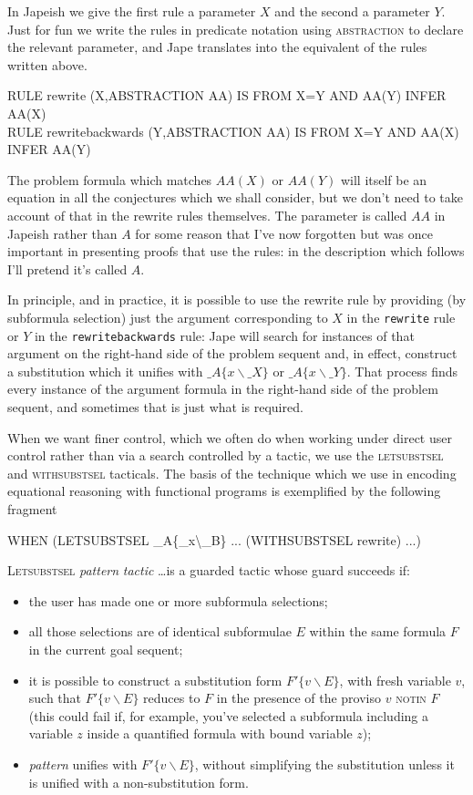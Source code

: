 In Japeish we give the first rule a parameter $X$ and the second a parameter $Y$. Just for fun we write the rules in predicate notation using \textsc{abstraction} to declare the relevant parameter, and Jape translates into the equivalent of the rules written above.
\begin{japeish}
RULE   rewrite (X,ABSTRACTION AA)           IS FROM X=Y AND AA(Y) INFER AA(X)\\
RULE   rewritebackwards (Y,ABSTRACTION AA)  IS FROM X=Y AND AA(X) INFER AA(Y)
\end{japeish}
The problem formula which matches $AA(X)$ or $AA(Y)$ will itself be an equation in all the conjectures which we shall consider, but we don't need to take account of that in the rewrite rules themselves. The parameter is called $AA$ in Japeish rather than $A$ for some reason that I've now forgotten but was once important in presenting proofs that use the rules: in the description which follows I'll pretend it's called $A$.

In principle, and in practice, it is possible to use the rewrite rule by providing (by subformula selection) just the argument corresponding to $X$ in the \texttt{rewrite} rule or $Y$ in the \texttt{rewritebackwards} rule: Jape will search for instances of that argument on the right-hand side of the problem sequent and, in effect, construct a substitution which it unifies with $\_A\{x\backslash\_X\}$ or $\_A\{x\backslash\_Y\}$. That process finds every instance of the argument formula in the right-hand side of the problem sequent, and sometimes that is just what is required.

When we want finer control, which we often do when working under direct user control rather than via a search controlled by a tactic, we use the \textsc{letsubstsel} and \textsc{withsubstsel} tacticals. The basis of the technique which we use in encoding equational reasoning with functional programs is exemplified by the following fragment
\begin{japeish}
WHEN (LETSUBSTSEL \_A\{\_x\textbackslash \_B\} ... (WITHSUBSTSEL rewrite) ...)
\end{japeish}

\textsc{Letsubstsel} \textit{pattern} \textit{tactic} \dots  is a guarded tactic whose guard succeeds if:
\begin{itemize}
\item the user has made one or more subformula selections;
\item all those selections are of identical subformulae $E$ within the same formula $F$ in the current goal sequent;
\item it is possible to construct a substitution form $F'\{v\backslash E\}$, with fresh variable $v$, such that $F'\{v\backslash E\}$ reduces to $F$ in the presence of the proviso $v$ \textsc{notin} $F$ (this could fail if, for example, you've selected a subformula including a variable $z$ inside a quantified formula with bound variable $z$);
\item \textit{pattern} unifies with $F'\{v\backslash E\}$, without simplifying the substitution unless it is unified with a non-substitution form.
\end{itemize}

